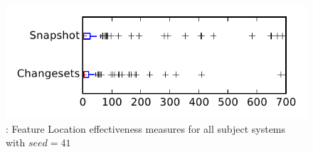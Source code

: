 
\begin{figure}
\centering
\includegraphics[height=0.4\textheight]{figures/flt_seed/rq1_tiny_41}
\caption{\rone: Feature Location effectiveness measures for all subject systems with $seed=41$}
\label{fig:flt_seed:rq1:tiny}
\end{figure}
